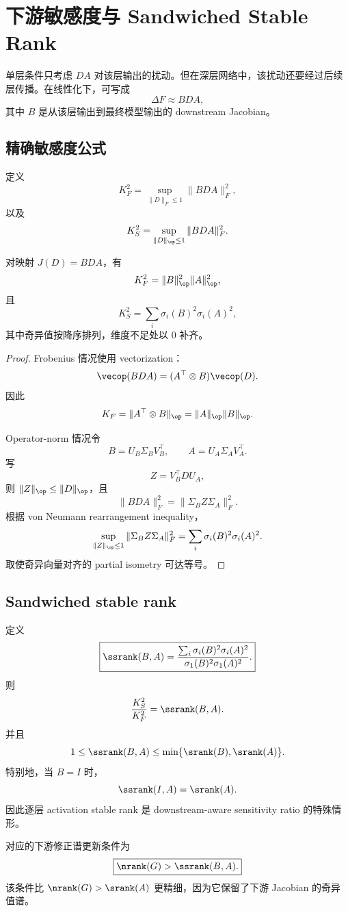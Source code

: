 \section{下游敏感度与 Sandwiched Stable Rank}

单层条件只考虑 \(DA\) 对该层输出的扰动。但在深层网络中，该扰动还要经过后续层传播。在线性化下，可写成
\[
\Delta F\approx BDA,
\]
其中 \(B\) 是从该层输出到最终模型输出的 downstream Jacobian。

\subsection{精确敏感度公式}

定义
\[
K_F^2=\sup_{\|D\|_F\le 1}\|BDA\|_F^2,
\]
以及
\[
K_S^2=\sup_{\|D\|_{\op}\le 1}\|BDA\|_F^2.
\]

\begin{theorem}
对映射 \(J(D)=BDA\)，有
\[
K_F^2=\|B\|_{\op}^2\|A\|_{\op}^2,
\]
且
\[
K_S^2=\sum_i\sigma_i(B)^2\sigma_i(A)^2,
\]
其中奇异值按降序排列，维度不足处以 \(0\) 补齐。
\end{theorem}

\begin{proof}
Frobenius 情况使用 vectorization：
\[
\vecop(BDA)=(A^\top\otimes B)\vecop(D).
\]
因此
\[
K_F=\|A^\top\otimes B\|_{\op}=\|A\|_{\op}\|B\|_{\op}.
\]

Operator-norm 情况令
\[
B=U_B\Sigma_BV_B^\top,
\qquad
A=U_A\Sigma_AV_A^\top.
\]
写
\[
Z=V_B^\top D U_A,
\]
则 \(\|Z\|_{\op}\le \|D\|_{\op}\)，且
\[
\|BDA\|_F^2
=\|\Sigma_B Z\Sigma_A\|_F^2.
\]
根据 von Neumann rearrangement inequality，
\[
\sup_{\|Z\|_{\op}\le 1}\|\Sigma_B Z\Sigma_A\|_F^2
=
\sum_i\sigma_i(B)^2\sigma_i(A)^2.
\]
取使奇异向量对齐的 partial isometry 可达等号。
\end{proof}

\subsection{Sandwiched stable rank}

定义
\[
\boxed{
\ssrank(B,A)=
\frac{\sum_i\sigma_i(B)^2\sigma_i(A)^2}
{\sigma_1(B)^2\sigma_1(A)^2}.
}
\]
则
\[
\frac{K_S^2}{K_F^2}=\ssrank(B,A).
\]
并且
\[
1\le \ssrank(B,A)
\le
\min\{\srank(B),\srank(A)\}.
\]
特别地，当 \(B=I\) 时，
\[
\ssrank(I,A)=\srank(A).
\]
因此逐层 activation stable rank 是 downstream-aware sensitivity ratio 的特殊情形。

对应的下游修正谱更新条件为
\[
\boxed{\nrank(G)>\ssrank(B,A).}
\]
该条件比 \(\nrank(G)>\srank(A)\) 更精细，因为它保留了下游 Jacobian 的奇异值谱。
